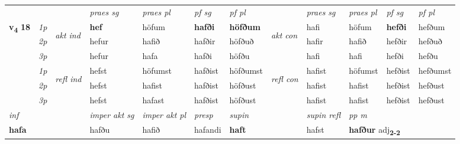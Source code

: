 \begin{longtable}[l]{X>{\footnotesize\itshape}llXXXXlXXXX}
 & &   & \textit{praes sg}  & \textit{praes pl}    & \textit{ pf sg} & \textit{pf pl} & & \textit{praes sg}  & \textit{praes pl}    & \textit{pf sg} & \textit{pf pl }  \\ \cmidrule{4-7} \cmidrule{9-12}
 \multirow{2}{*}{{{\textbf{v{\textsubscript{4}}} \Large{\textbf{18}}}}}  & 1p & \multirow{3}{*}{\begin{turn}{90}\textit{akt ind}\end{turn}} & \textbf{hef} & höfum & \textbf{hafði} & \textbf{höfðum} & \multirow{3}{*}{\begin{turn}{90}\textit{akt con}\end{turn}} &hafi & höfum & \textbf{hefði} & hefðum\\*
 & 2p &  &  hefur  & hafið & hafðir & höfðuð & & hafir & hafið & hefðir & hefðuð \\*
 & 3p &  & hefur & hafa & hafði & höfðu & & hafi & hafi& hefði & hefðu \\*
\cmidrule{4-7} \cmidrule{9-12}
 & 1p & \multirow{3}{*}{\begin{turn}{90}\textit{refl ind}\end{turn}}  & hefst & höfumst & hafðist & höfðumst & \multirow{3}{*}{\begin{turn}{90}\textit{refl con}\end{turn}}  &hafist & höfumst & hefðist & hefðumst \\*
 & 2p &  & hefst & hafist & hafðist & höfðust & &hafist & hafist & hefðist & hefðust \\*
 & 3p  & & hefst & hafast & hafðist & höfðust & & hafist & hafist& hefðist & hefðust \\*
\cmidrule{4-7} \cmidrule{9-12}

   {\textit{inf}} & &  & \textit{imper akt sg} & \textit{imper akt pl}   & \textit{presp} & \textit{supin} && \textit{supin refl} & \textit{pp m} \\*
  {\textbf{hafa}} & && hafðu  & hafið   & hafandi &  \textbf{haft} && hafst & \multicolumn{2}{l}{\textbf{hafður} adj\textbf{\textsubscript{2-2}}} \\*

\midrule


\end{longtable}
